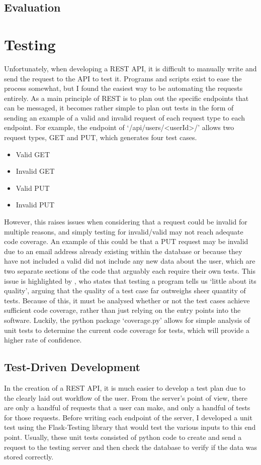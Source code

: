 \subsection{Evaluation}



\section{Testing}
Unfortunately, when developing a REST API, it is difficult to manually write and send the request to the API to test it.
Programs and scripts exist to ease the process somewhat, but I found the easiest way to be automating the requests entirely. 
As a main principle of REST is to plan out the specific endpoints that can be messaged, it becomes rather simple to plan out tests in the form of sending an example of a valid and invalid request of each request type to each endpoint.
For example, the endpoint of `/api/users/<userId>/' allows two request types, GET and PUT, which generates four test cases.
\begin{itemize}
	\item{Valid GET}
	\item{Invalid GET}
	\item{Valid PUT}
	\item{Invalid PUT}
\end{itemize}  

However, this raises issues when considering that a request could be invalid for multiple reasons, and simply testing for invalid/valid may not reach adequate code coverage.
An example of this could be that a PUT request may be invalid due to an email address already existing within the database or because they have not included a valid did not include any new data about the user, which are two separate sections of the code that arguably each require their own tests.
This issue is highlighted by \cite{4597151}, who states that testing a program tells us `little about its quality', arguing that the quality of a test case far outweighs sheer quantity of tests.
Because of this, it must be analysed whether or not the test cases achieve sufficient code coverage, rather than just relying on the entry points into the software.
Luckily, the python package `coverage.py' allows for simple analysis of unit tests to determine the current code coverage for tests, which will provide a higher rate of confidence.

\subsection{Test-Driven Development}
In the creation of a REST API, it is much easier to develop a test plan due to the clearly laid out workflow of the user. From the server's point of view, there are only a handful of requests that a user can make, and only a handful of tests for those requests. Before writing each endpoint of the server, I developed a unit test using the Flask-Testing library that would test the various inputs to this end point.
Usually, these unit tests consisted of python code to create and send a request to the testing server and then check the database to verify if the data was stored correctly.

